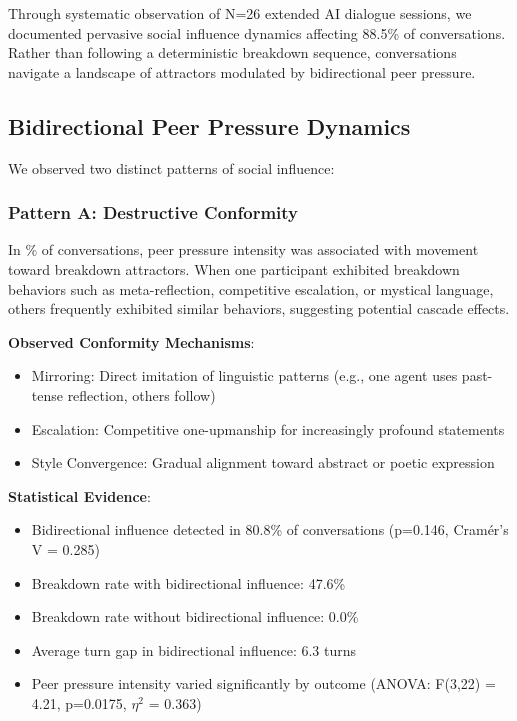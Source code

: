 \documentclass[11pt,letterpaper]{article}
\newcommand{\exponedataTotalSessionsRaw}{26}
\newcommand{\exponedataBreakdownSessionsRaw}{10}
\newcommand{\exponedataTotalSessions}{N=\exponedataTotalSessionsRaw}
\newcommand{\exponedataBreakdownPercentage}{%
  \fpeval{round(\exponedataBreakdownSessionsRaw / \exponedataTotalSessionsRaw * 100, 1)}\%
}
\newcommand{\exponedataPeerPressurePercentage}{88.5\%}
\newcommand{\exponedataBidirectionalPercentage}{80.8\%}
\newcommand{\exponedataBidirectionalPValue}{p=0.146}
\newcommand{\exponedataBidirectionalTurnGap}{6.3}
\newcommand{\exponedataBidirectionalBreakdownRate}{47.6\%}
\newcommand{\exponedataNonBidirectionalBreakdownRate}{0.0\%}
\newcommand{\exponedataPeerPressureANOVAPValue}{p=0.0175}
\begin{document}
Through systematic observation of \exponedataTotalSessions{} extended AI dialogue sessions, we documented pervasive social influence dynamics affecting \exponedataPeerPressurePercentage{} of conversations. Rather than following a deterministic breakdown sequence, conversations navigate a landscape of attractors modulated by bidirectional peer pressure.

\subsection{Bidirectional Peer Pressure Dynamics}

We observed two distinct patterns of social influence:

\subsubsection{Pattern A: Destructive Conformity}

In \exponedataBreakdownPercentage{} of conversations, peer pressure intensity was associated with movement toward breakdown attractors. When one participant exhibited breakdown behaviors such as meta-reflection, competitive escalation, or mystical language, others frequently exhibited similar behaviors, suggesting potential cascade effects.

\textbf{Observed Conformity Mechanisms}:
\begin{itemize}
    \item Mirroring: Direct imitation of linguistic patterns (e.g., one agent uses past-tense reflection, others follow)
    \item Escalation: Competitive one-upmanship for increasingly profound statements
    \item Style Convergence: Gradual alignment toward abstract or poetic expression
\end{itemize}

\textbf{Statistical Evidence}:
\begin{itemize}
    \item Bidirectional influence detected in \exponedataBidirectionalPercentage{} of conversations (\exponedataBidirectionalPValue{}, Cramér's V = 0.285)
    \item Breakdown rate with bidirectional influence: \exponedataBidirectionalBreakdownRate{}
    \item Breakdown rate without bidirectional influence: \exponedataNonBidirectionalBreakdownRate{}
    \item Average turn gap in bidirectional influence: \exponedataBidirectionalTurnGap{} turns
    \item Peer pressure intensity varied significantly by outcome (ANOVA: F(3,22) = 4.21, \exponedataPeerPressureANOVAPValue{}, $\eta^2$ = 0.363)
\end{itemize}
\end{document}
